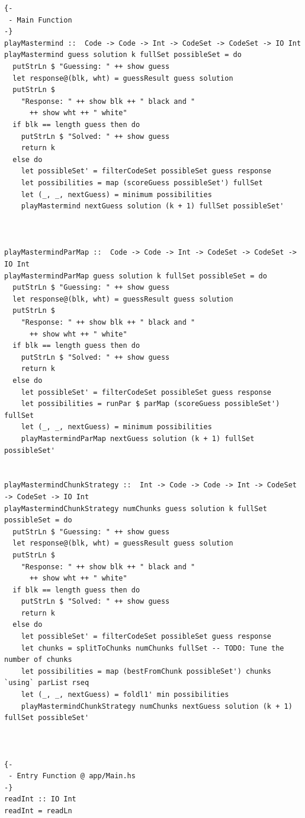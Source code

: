 \documentclass{article}
\begin{document}
\begin{verbatim}
{-
 - Main Function
-}
playMastermind ::  Code -> Code -> Int -> CodeSet -> CodeSet -> IO Int
playMastermind guess solution k fullSet possibleSet = do
  putStrLn $ "Guessing: " ++ show guess
  let response@(blk, wht) = guessResult guess solution
  putStrLn $
    "Response: " ++ show blk ++ " black and "
      ++ show wht ++ " white"
  if blk == length guess then do
    putStrLn $ "Solved: " ++ show guess
    return k
  else do
    let possibleSet' = filterCodeSet possibleSet guess response
    let possibilities = map (scoreGuess possibleSet') fullSet
    let (_, _, nextGuess) = minimum possibilities
    playMastermind nextGuess solution (k + 1) fullSet possibleSet'



playMastermindParMap ::  Code -> Code -> Int -> CodeSet -> CodeSet -> IO Int
playMastermindParMap guess solution k fullSet possibleSet = do
  putStrLn $ "Guessing: " ++ show guess
  let response@(blk, wht) = guessResult guess solution
  putStrLn $
    "Response: " ++ show blk ++ " black and "
      ++ show wht ++ " white"
  if blk == length guess then do
    putStrLn $ "Solved: " ++ show guess
    return k
  else do
    let possibleSet' = filterCodeSet possibleSet guess response
    let possibilities = runPar $ parMap (scoreGuess possibleSet') fullSet
    let (_, _, nextGuess) = minimum possibilities
    playMastermindParMap nextGuess solution (k + 1) fullSet possibleSet'
    
  
playMastermindChunkStrategy ::  Int -> Code -> Code -> Int -> CodeSet -> CodeSet -> IO Int
playMastermindChunkStrategy numChunks guess solution k fullSet possibleSet = do
  putStrLn $ "Guessing: " ++ show guess
  let response@(blk, wht) = guessResult guess solution
  putStrLn $
    "Response: " ++ show blk ++ " black and "
      ++ show wht ++ " white"
  if blk == length guess then do
    putStrLn $ "Solved: " ++ show guess
    return k
  else do
    let possibleSet' = filterCodeSet possibleSet guess response
    let chunks = splitToChunks numChunks fullSet -- TODO: Tune the number of chunks
    let possibilities = map (bestFromChunk possibleSet') chunks `using` parList rseq
    let (_, _, nextGuess) = foldl1' min possibilities
    playMastermindChunkStrategy numChunks nextGuess solution (k + 1) fullSet possibleSet'



{-
 - Entry Function @ app/Main.hs
-}
readInt :: IO Int
readInt = readLn


\end{verbatim}
\end{document}
